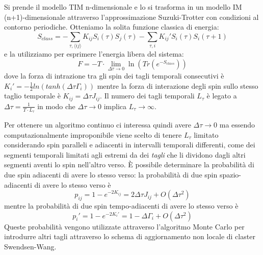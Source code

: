 Si prende il modello TIM n-dimensionale e lo si trasforma in un modello IM (n+1)-dimensionale attraverso l'approssimazione Suzuki-Trotter con condizioni al contorno periodiche. Otteniamo la solita funzione classica di energia:
$$S_{class} = - \sum_{\tau,\langle ij \rangle} K_{ij} S_i(\tau) S_j(\tau) - \sum_{\tau, i} K_{ij}' S_i(\tau) S_i(\tau+1)$$
e la utilizziamo per esprimere l'energia libera del sistema:
$$F = - T \cdot \lim_{\Delta \tau \to 0} \ln(Tr(e^{-S_{class}}))$$
dove la forza di intrazione tra gli spin dei tagli temporali consecutivi è $K_{i}' = - \frac{1}{2} ln( tanh( \Delta \tau \Gamma_i) )$ mentre la forza di interazione degli spin sullo stesso taglio temporale è $K_{ij} = \Delta \tau J_{ij}$. Il numero dei tagli temporali $L_{\tau}$ è legato a $\Delta \tau = \frac{1}{T \cdot L_{\tau}}$ in modo che $\Delta \tau \to 0$ implica $L_{\tau} \to \infty$.

Per ottenere un algoritmo continuo ci interessa quindi avere $\Delta \tau \to 0$ ma essendo computazionalmente improponibile viene scelto di tenere $L_{\tau}$ limitato considerando spin paralleli e adiacenti in intervalli temporali differenti, come dei segmenti temporali limitati agli estremi da dei \textit{tagli} che li dividono dagli altri segmenti aventi lo spin nell'altro verso.
È possibile determinare la probabilità di due spin adiacenti di avere lo stesso verso:
la probabilità di due spin spazio-adiacenti di avere lo stesso verso è
$$p_{ij} = 1 - e^{-2K_{ij}} = 2\Delta \tau J_{ij} + O(\Delta \tau^2)$$
mentre la probabilità di due spin tempo-adiacenti di avere lo stesso verso è
$$p_i' = 1 - e^{-2K_{i}'} = 1 - \Delta \Gamma_{i} + O(\Delta \tau^2)$$
Queste probabilità vengono utilizzate attraverso l'algoritmo Monte Carlo per introdurre altri tagli attraverso lo schema di aggiornamento non locale di claster Swendsen-Wang.
